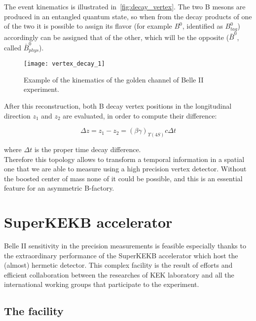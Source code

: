 The event kinematics is illustrated in~\autoref{fig:decay_vertex}. The two B mesons are produced in an entangled quantum state, so when from the decay products of one of the two it is possible to assign its flavor (for example $B^{0}$, identified as $B_{tag}^{0}$) accordingly can be assigned that of the other, which will be the opposite ($\bar{B}^{0}$, called $\bar{B}_{phys}^{0}$).

\begin{figure}[h!]
\centering
\texttt{[image: vertex\_decay\_1]}
\caption{Example of the kinematics of the golden channel of Belle II experiment.}
\label{fig:decay_vertex}
\end{figure}

After this reconstruction, both B decay vertex positions in the longitudinal direction $\textit{z}_{1}$ and $\textit{z}_{2}$ are evaluated, in order to compute their difference:

\begin{equation}
\Delta \textit{z} = \textit{z}_{1} - \textit{z}_{2} = (\beta\gamma)_{\Upsilon(4S)}c\Delta t
\end{equation}

where $\Delta t$ is the proper time decay difference. \\
Therefore this topology allows to transform a temporal information in a spatial one that we are able to measure using a high precision vertex detector. Without the boosted center of mass none of it could be possible, and this is an essential feature for an asymmetric B-factory. 


\section{SuperKEKB accelerator}

Belle II sensitivity in the precision measurements is feasible especially thanks to the extraordinary performance of the SuperKEKB accelerator which host the (almost) hermetic detector. This complex facility is the result of efforts and efficient collaboration between the researches of KEK laboratory and all the international working groups that participate to the experiment.


\subsection{The facility}

